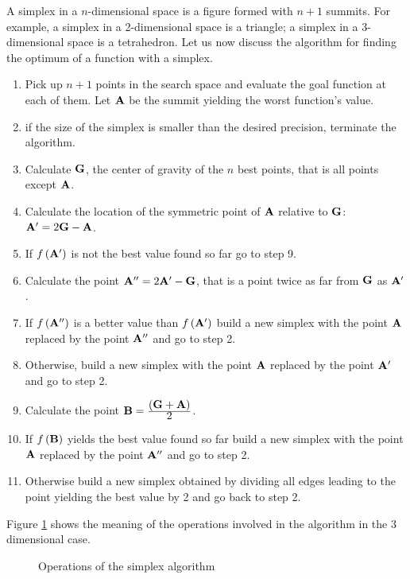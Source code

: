 \documentclass[twoside]{book}
\begin{document}
A simplex in a $n$-dimensional space is a figure formed with $n+1$
summits. For example, a simplex in a 2-dimensional space is a
triangle; a simplex in a 3-dimensional space is a tetrahedron.
Let us now discuss the algorithm for finding the optimum of a
function with a simplex.
\begin{enumerate}
  \item Pick up $n+1$ points in the search space and evaluate
  the goal function at each of them. Let ${\bf A}$ be the summit
  yielding the worst function's value.
  \item if the size of the simplex is smaller than the desired
  precision, terminate the algorithm.
  \item Calculate ${\bf G}$, the center of gravity of the $n$ best points,
  that is all points except ${\bf A}$.
  \item Calculate the location of the symmetric point of ${\bf A}$
  relative to ${\bf G}$: ${\bf A}^{\prime}=2{\bf G}-{\bf A}$.
  \item If $f\left({\bf A}^{\prime}\right)$ is not the best value
  found so far go to step 9.
  \item Calculate the point ${\bf A}^{\prime\prime}=2{\bf A}^{\prime}-{\bf
  G}$, that is a point twice as far from ${\bf G}$ as ${\bf
  A}^{\prime}$.
  \item If $f\left({\bf A}^{\prime\prime}\right)$ is a
  better value than $f\left({\bf A}^{\prime}\right)$ build a new
  simplex with the point ${\bf A}$ replaced by the point ${\bf
  A}^{\prime\prime}$ and go to step 2.
  \item Otherwise, build a new
  simplex with the point ${\bf A}$ replaced by the point ${\bf
  A}^{\prime}$ and go to step 2.
  \item Calculate the point ${\bf B}= {\displaystyle\left({\bf G}+{\bf
A}\right)\over\displaystyle 2}$.
  \item If $f\left({\bf B}\right)$ yields the best value found so far
  build a new simplex with the point ${\bf A}$ replaced by the point ${\bf
  A}^{\prime\prime}$ and go to step 2.
  \item Otherwise build a new simplex obtained by dividing all
  edges leading to the point yielding the best value by 2 and go
  back to step 2.
\end{enumerate}
Figure \ref{fig:simplexsample} shows the meaning of the operations
involved in the algorithm in the 3 dimensional case.
\begin{figure}
\center{}
\caption{Operations of the simplex
algorithm}\label{fig:simplexsample}
\end{figure}
\end{document}
